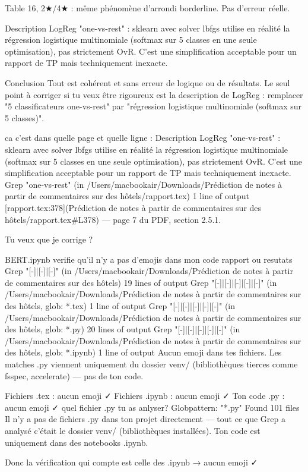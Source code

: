 Table 16, 2★/4★ : même phénomène d'arrondi borderline. Pas d'erreur réelle.

Description LogReg "one-vs-rest" : sklearn avec solver lbfgs utilise en réalité la régression logistique multinomiale (softmax sur 5 classes en une seule optimisation), pas strictement OvR. C'est une simplification acceptable pour un rapport de TP mais techniquement inexacte.

Conclusion
Tout est cohérent et sans erreur de logique ou de résultats. Le seul point à corriger si tu veux être rigoureux est la description de LogReg : remplacer "5 classificateurs one-vs-rest" par "régression logistique multinomiale (softmax sur 5 classes)".

ca c'est dans quelle page et quelle ligne : Description LogReg "one-vs-rest" : sklearn avec solver lbfgs utilise en réalité la régression logistique multinomiale (softmax sur 5 classes en une seule optimisation), pas strictement OvR. C'est une simplification acceptable pour un rapport de TP mais techniquement inexacte.
Grep "one-vs-rest" (in /Users/macbookair/Downloads/Prédiction de notes à partir de commentaires sur des hôtels/rapport.tex)
1 line of output
[rapport.tex:378](Prédiction de notes à partir de commentaires sur des hôtels/rapport.tex#L378) — page 7 du PDF, section 2.5.1.

Tu veux que je corrige ?

BERT.ipynb
verifie qu'il n'y a pas d'emojis dans mon code rapport ou resutats
Grep "[-]|[-]|[-]" (in /Users/macbookair/Downloads/Prédiction de notes à partir de commentaires sur des hôtels)
19 lines of output
Grep "[-]|[-]|[-]|[-]|[-]" (in /Users/macbookair/Downloads/Prédiction de notes à partir de commentaires sur des hôtels, glob: *.tex)
1 line of output
Grep "[-]|[-]|[-]|[-]|[-]" (in /Users/macbookair/Downloads/Prédiction de notes à partir de commentaires sur des hôtels, glob: *.py)
20 lines of output
Grep "[-]|[-]|[-]|[-]|[-]" (in /Users/macbookair/Downloads/Prédiction de notes à partir de commentaires sur des hôtels, glob: *.ipynb)
1 line of output
Aucun emoji dans tes fichiers. Les matches .py viennent uniquement du dossier venv/ (bibliothèques tierces comme fsspec, accelerate) — pas de ton code.

Fichiers .tex : aucun emoji ✓
Fichiers .ipynb : aucun emoji ✓
Ton code .py : aucun emoji ✓
quel fichier .py tu as anlyser?
Globpattern: "*.py"
Found 101 files
Il n'y a pas de fichiers .py dans ton projet directement — tout ce que Grep a analysé c'était le dossier venv/ (bibliothèques installées). Ton code est uniquement dans des notebooks .ipynb.

Donc la vérification qui compte est celle des .ipynb → aucun emoji ✓

